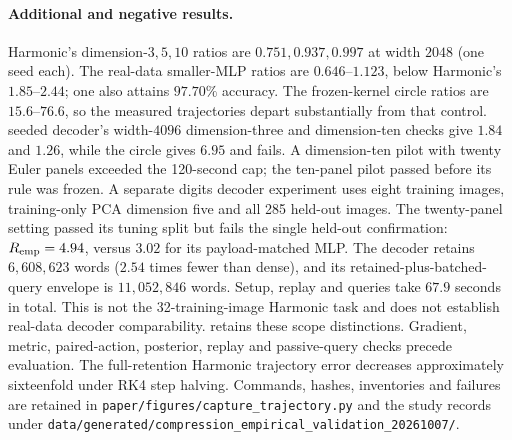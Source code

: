 \paragraph{Additional and negative results.}
Harmonic's dimension-$3,5,10$ ratios are $0.751,0.937,0.997$ at width
$2048$ (one seed each). The real-data smaller-MLP ratios are
$0.646$--$1.123$, below Harmonic's $1.85$--$2.44$; one also attains
$97.70\%$ accuracy. The frozen-kernel circle ratios are $15.6$--$76.6$,
so the measured trajectories depart substantially from that control.
seeded decoder's width-$4096$ dimension-three and dimension-ten checks
give $1.84$ and $1.26$, while the circle gives $6.95$ and fails.
A dimension-ten pilot with twenty Euler panels exceeded the 120-second
cap; the ten-panel pilot passed before its rule was frozen.
A separate digits decoder experiment uses eight training images, training-only
PCA dimension five and all 285 held-out images. The twenty-panel setting
passed its tuning split but fails the single held-out confirmation:
$R_{\rm emp}=4.94$, versus $3.02$ for its payload-matched MLP. The decoder
retains $6{,}608{,}623$ words ($2.54$ times fewer than dense), and its
retained-plus-batched-query envelope is $11{,}052{,}846$ words. Setup, replay
and queries take $67.9$ seconds in total. This is not the 32-training-image
Harmonic task and does not establish real-data decoder comparability.
 retains these scope distinctions.
Gradient, metric, paired-action, posterior, replay and passive-query
checks precede evaluation. The full-retention Harmonic trajectory error
decreases approximately sixteenfold under RK4 step halving.
Commands, hashes, inventories and failures are retained in
\texttt{paper/figures/capture\_trajectory.py} and the study records under
\texttt{data/generated/compression\_empirical\_validation\_20261007/}.
\endgroup

